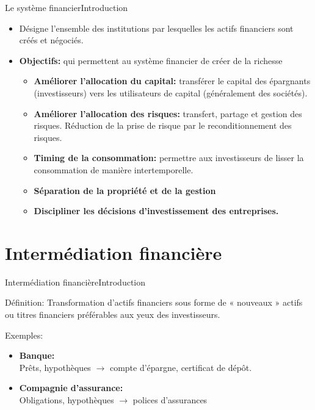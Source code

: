 \documentclass{beamer}
\begin{document}
\begin{frame}{Le système financier}{Introduction}
\begin{itemize}
\item Désigne l'ensemble des institutions par lesquelles les actifs financiers sont créés et négociés.
\item \textbf{Objectifs:} qui permettent au système financier de créer de la richesse
\begin{itemize}
\item \textbf{Améliorer l'allocation du capital:} transférer le capital des épargnants (investisseurs) vers les utilisateurs de capital (généralement des sociétés).
\item \textbf{Améliorer l'allocation des risques:} transfert, partage et gestion des risques. Réduction de la prise de risque par le reconditionnement des risques.
\item \textbf{Timing de la consommation:} permettre aux investisseurs de lisser la consommation de manière intertemporelle.
\item \textbf{Séparation de la propriété et de la gestion}
\item \textbf{Discipliner les décisions d'investissement des entreprises.}
\end{itemize}
\end{itemize}
\end{frame}


\section{Intermédiation financière}
\begin{frame}{Intermédiation financière}{Introduction}
\begin{block}{Définition:}
Transformation d’actifs financiers sous forme de « nouveaux » actifs ou titres financiers préférables aux yeux des investisseurs.
\end{block}
\begin{block}{Exemples:}
\begin{itemize}
\item \textbf{Banque:} \\ Prêts, hypothèques $\rightarrow$ compte
d’épargne, certificat de dépôt.
\item \textbf{Compagnie d’assurance:} \\ Obligations, hypothèques $\rightarrow$ polices d’assurances
\end{itemize}
\end{block}

\end{frame}
\end{document}
